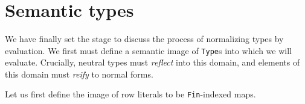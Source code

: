 \documentclass[authoryear, acmsmall, screen, review, nonacm]{acmart} %
\begin{document}
\begin{code}[hide]
\AgdaSpace{}%
\AgdaSymbol{)}\AgdaSpace{}%
\AgdaSymbol{=}\AgdaSpace{}%
\AgdaSymbol{(}\AgdaSpace{}%
\AgdaSymbol{)}\AgdaSpace{}%
\AgdaSpace{}%
\AgdaSymbol{(}\AgdaSpace{}%
\AgdaSymbol{)}\<%
\\
%
\\[\AgdaEmptyExtraSkip]%
\>[0]\AgdaSpace{}%
\AgdaSymbol{(}\AgdaSpace{}%
\AgdaSpace{}%
\AgdaSpace{}%
\AgdaOperator{\AgdaInductiveConstructor{\textasciitilde{}}}\AgdaSpace{}%
\AgdaSymbol{)}\AgdaSpace{}%
\AgdaSymbol{=}\AgdaSpace{}%
\AgdaSymbol{(}\AgdaSpace{}%
\AgdaSymbol{)}\AgdaSpace{}%
\AgdaSpace{}%
\AgdaSymbol{(}\AgdaSpace{}%
\AgdaSymbol{)}\AgdaSpace{}%
\AgdaOperator{\AgdaInductiveConstructor{\textasciitilde{}}}\AgdaSpace{}%
\AgdaSymbol{(}\AgdaSpace{}%
\AgdaSymbol{)}\<%
\\
\>[0]\AgdaSpace{}%
\AgdaSymbol{(}\AgdaSpace{}%
\AgdaSpace{}%
\AgdaSymbol{)}\AgdaSpace{}%
\AgdaSymbol{=}\AgdaSpace{}%
\AgdaSymbol{(}\AgdaSpace{}%
\AgdaSymbol{)}\AgdaSpace{}%
\AgdaSpace{}%
\AgdaSymbol{(}\AgdaSpace{}%
\AgdaSymbol{)}\<%
\end{code}


\section{Semantic types}

We have finally set the stage to discuss the process of normalizing types by evaluation. We first must define a semantic image of \verb!Type!s into which we will evaluate. Crucially, neutral types must \emph{reflect} into this domain, and elements of this domain must \emph{reify} to normal forms.

Let us first define the image of row literals to be \verb!Fin!-indexed maps.

\begin{code}%
\>[0]\AgdaSpace{}%
\AgdaSymbol{:}\AgdaSpace{}%
\AgdaSpace{}%
\AgdaSpace{}%
\<%
\\
\>[0]\AgdaSpace{}%
\AgdaSpace{}%
\AgdaSymbol{=}\AgdaSpace{}%
\AgdaFunction{∃[}\AgdaSpace{}%
\AgdaSpace{}%
\AgdaFunction{]}\AgdaSymbol{(}\AgdaSpace{}%
\AgdaSpace{}%
\AgdaSpace{}%
\AgdaSpace{}%
\AgdaSpace{}%
\AgdaSymbol{)}\<%
\end{code}
\end{document}
